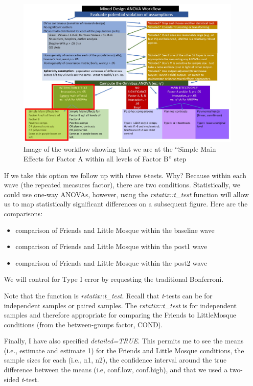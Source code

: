 \documentclass[
  11pt,
]{book}
\providecommand{\tightlist}{%
  \setlength{\itemsep}{0pt}\setlength{\parskip}{0pt}}
\begin{document}
\begin{figure}
\centering
\includegraphics{images/mixed/mx_SimpleMainA.jpg}
\caption{Image of the workflow showing that we are at the ``Simple Main Effects for Factor A within all levels of Factor B'' step}
\end{figure}

If we take this option we follow up with three \emph{t}-tests. Why? Because within each wave (the repeated measures factor), there are two conditions. Statistically, we could use one-way ANOVAs, however, using the \emph{rstatix::t\_test} function will allow us to map statistically significant differences on a subsequent figure. Here are the comparisons:

\begin{itemize}
\tightlist
\item
  comparison of Friends and Little Mosque within the baseline wave
\item
  comparison of Friends and Little Mosque within the post1 wave
\item
  comparison of Friends and Little Mosque within the post2 wave
\end{itemize}

We will control for Type I error by requesting the traditional Bonferroni.

Note that the function is \emph{rstatix::t\_test}. Recall that \emph{t}-tests can be for independent samples or paired samples. The \emph{rstatix::t\_test} is for independent samples and therefore appropriate for comparing the Friends to LittleMosque conditions (from the between-groups factor, COND).

Finally, I have also specified \emph{detailed=TRUE}. This permits me to see the means (i.e., estimate and estimate 1) for the Friends and Little Mosque conditions, the sample sizes for each (i.e., n1, n2), the confidence interval around the true difference between the means (i.e, conf.low, conf.high), and that we used a two-sided \emph{t}-test.
\end{document}
